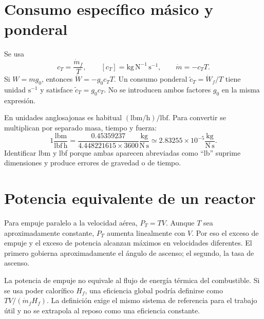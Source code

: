 \section{Consumo específico másico y ponderal}
Se usa
\begin{equation}
c_T=\frac{\dot m_f}{T},\qquad
[c_T]=\mathrm{kg\,N^{-1}\,s^{-1}},\qquad
\dot m=-c_TT.
\label{eq:jetmassflow}
\end{equation}
Si $W=mg_0$, entonces $\dot W=-g_0c_TT$. Un consumo ponderal $\widetilde c_T=\dot W_f/T$ tiene unidad $\mathrm{s^{-1}}$ y satisface $\widetilde c_T=g_0c_T$. No se introducen ambos factores $g_0$ en la misma expresión.


En unidades anglosajonas es habitual $(\mathrm{lbm/h})/\mathrm{lbf}$. Para convertir se multiplican por separado masa, tiempo y fuerza:
\begin{equation}
1\frac{\mathrm{lbm}}{\mathrm{lbf\,h}}
=\frac{0.45359237}{4.448221615\times3600}
\frac{\mathrm{kg}}{\mathrm{N\,s}}
\simeq2.83255\times10^{-5}\frac{\mathrm{kg}}{\mathrm{N\,s}}.
\end{equation}
Identificar lbm y lbf porque ambas aparecen abreviadas como ``lb'' suprime dimensiones y produce errores de gravedad o de tiempo.

\section{Potencia equivalente de un reactor}
Para empuje paralelo a la velocidad aérea, $P_T=TV$. Aunque $T$ sea aproximadamente constante, $P_T$ aumenta linealmente con $V$. Por eso el exceso de empuje y el exceso de potencia alcanzan máximos en velocidades diferentes. El primero gobierna aproximadamente el ángulo de ascenso; el segundo, la tasa de ascenso.

La potencia de empuje no equivale al flujo de energía térmica del combustible. Si se usa poder calorífico $H_f$, una eficiencia global podría definirse como $TV/(\dot m_fH_f)$. La definición exige el mismo sistema de referencia para el trabajo útil y no se extrapola al reposo como una eficiencia constante.

